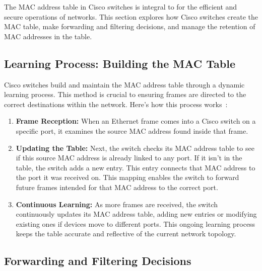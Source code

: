 \documentclass[11pt,a4paper]{article}
\begin{document}
The MAC address table in Cisco switches is integral to for the efficient and secure operations of networks. This section explores how Cisco switches create the MAC table, make forwarding and filtering decisions, and manage the retention of MAC addresses in the table.


\subsection*{Learning Process: Building the MAC Table}

Cisco switches build and maintain the MAC address table through a dynamic learning process. This method is crucial to ensuring frames are directed to the correct destinations within the network. Here’s how this process works~\cite{Learning-Process}:

\begin{enumerate}
    
    \item \textbf{Frame Reception:} When an Ethernet frame comes into a Cisco switch on a specific port, it examines the source MAC address found inside that frame.

    \item \textbf{Updating the Table:} Next, the switch checks its MAC address table to see if this source MAC address is already linked to any port. If it isn’t in the table, the switch adds a new entry. This entry connects that MAC address to the port it was received on. This mapping enables the switch to forward future frames intended for that MAC address to the correct port.

    \item \textbf{Continuous Learning:} As more frames are received, the switch continuously updates its MAC address table, adding new entries or modifying existing ones if devices move to different ports. This ongoing learning process keeps the table accurate and reflective of the current network topology.

\end{enumerate}


\subsection*{Forwarding and Filtering Decisions}
\end{document}
